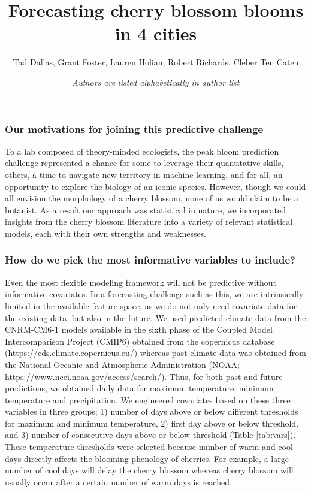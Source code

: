 \documentclass[a4paper,11pt]{article}
\title{Forecasting cherry blossom blooms in 4 cities}
\author{Tad Dallas,
Grant Foster,
Lauren Holian,
Robert Richards,
Cleber Ten Caten}
\date{\textit{Authors are listed alphabetically in author list}}
\begin{document}
\maketitle





\subsubsection{Our motivations for joining this predictive challenge}

To a lab composed of theory-minded ecologists, the peak bloom prediction challenge represented a chance for some to leverage their quantitative skills, others, a time to navigate new territory in machine learning, and for all, an opportunity to explore the biology of an iconic species. However, though we could all envision the morphology of a cherry blossom, none of us would claim to be a botanist. As a result our approach was statistical in nature, we incorporated insights from the cherry blossom literature into a variety of relevant statistical models, each with their own strengths and weaknesses.



\subsubsection{How do we pick the most informative variables to include?}

Even the most flexible modeling framework will not be predictive without informative covariates. In a forecasting challenge such as this, we are intrinsically limited in the available feature space, as we do not only need covariate data for the existing data, but also in the future. We used predicted climate data from the CNRM-CM6-1 models available in the sixth phase of the Coupled Model Intercomparison Project (CMIP6) obtained from the copernicus database (\url{https://cds.climate.copernicus.eu/}) whereas past climate data was obtained from the National Oceanic and Atmospheric Administration (NOAA; \url{https://www.ncei.noaa.gov/access/search/}). Thus, for both past and future predictions, we obtained daily data for maximum temperature, minimum temperature and precipitation. We engineered covariates based on these three variables in three groups; 1) number of days above or below different thresholds for maximum and minimum temperature, 2) first day above or below threshold, and 3) number of consecutive days above or below threshold (Table \ref{tab:vars}). These temperature thresholds were selected because number of warm and cool days directly affects the blooming phenology of cherries. For example, a large number of cool days will delay the cherry blossom whereas cherry blossom will usually occur after a certain number of warm days is reached. 
\end{document}
